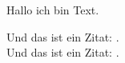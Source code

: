 Hallo ich bin Text.


Und das ist ein Zitat: \citet[12]{Knuth:1997:ACP:260999}.\\
Und das ist ein Zitat: \citep[12]{Knuth:1997:ACP:260999}.\\